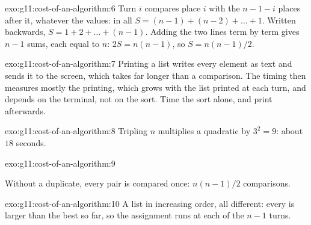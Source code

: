 \begin{solution}{exo:g11:cost-of-an-algorithm:6}
Turn $i$ compares place $i$ with the $n - 1 - i$ places after it, whatever the values: in all
$S = (n - 1) + (n - 2) + \dots + 1$. Written backwards, $S = 1 + 2 + \dots + (n - 1)$. Adding the two lines term by term
gives $n - 1$ sums, each equal to $n$: $2S = n(n - 1)$, so $S = n(n - 1)/2$.
\end{solution}

\begin{solution}{exo:g11:cost-of-an-algorithm:7}
Printing a list writes every element as text and sends it to the screen, which takes far longer than a comparison. The
timing then measures mostly the printing, which grows with the list printed at each turn, and depends on the terminal,
not on the sort. Time the sort alone, and print afterwards.
\end{solution}

\begin{solution}{exo:g11:cost-of-an-algorithm:8}
Tripling $n$ multiplies a quadratic  by $3^2 = 9$: about $18$ seconds.
\end{solution}

\begin{solution}{exo:g11:cost-of-an-algorithm:9}
\smallskip\noindent\hspace*{2em}

\noindent\hspace*{4em}

\noindent\hspace*{6em}

\noindent\hspace*{8em}

\noindent\hspace*{10em}

\noindent\hspace*{4em}

\smallskip\noindent Without a duplicate, every pair is compared once: $n(n - 1)/2$ comparisons.
\end{solution}

\begin{solution}{exo:g11:cost-of-an-algorithm:10}
A list in increasing order, all different: every  is larger than the best so far, so the assignment runs at
each of the $n - 1$ turns.
\end{solution}

